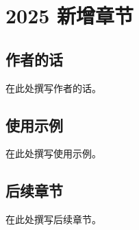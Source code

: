 
\chapter{2025 新增章节}
\label{chap:new-chapter}

\section{作者的话}
在此处撰写作者的话。

\section{使用示例}
在此处撰写使用示例。

\section{后续章节}
在此处撰写后续章节。